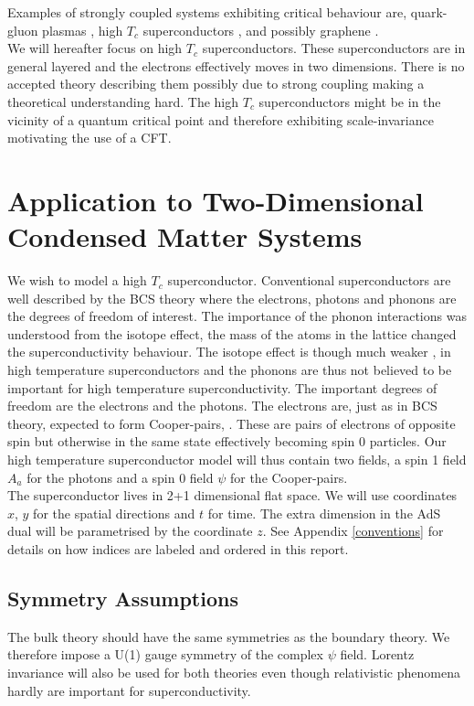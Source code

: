 \documentclass[12pt]{report}
\begin{document}
Examples of strongly coupled systems exhibiting critical behaviour are, quark-gluon plasmas \cite{PhysRevD.73.045013}, high $T_c$ superconductors \cite{hartnoll8}, and possibly graphene \cite{hartnoll8}.\\

We will hereafter focus on high $T_c$ superconductors. These superconductors are in general layered and the electrons effectively moves in two dimensions. There is no accepted theory describing them possibly due to strong coupling making a theoretical understanding hard. The high $T_c$ superconductors might be in the vicinity of a quantum critical point \cite{dome} and therefore exhibiting scale-invariance motivating the use of a CFT.

\chapter{Application to Two-Dimensional Condensed Matter Systems}
We wish to model a high $T_c$ superconductor. Conventional superconductors are well described by the BCS theory where the electrons, photons and phonons are the degrees of freedom of interest. The importance of the phonon interactions was understood from the isotope effect, the mass of the atoms in the lattice changed the superconductivity behaviour. The isotope effect is though much weaker \cite{leggett2006we}, in high temperature superconductors and the phonons are thus not believed to be important for high temperature superconductivity. The important degrees of freedom are the electrons and the photons. The electrons are, just as in BCS theory, expected to form Cooper-pairs, \cite{leggett2006we}. These are pairs of electrons of opposite spin but otherwise in the same state effectively becoming spin 0 particles. Our high temperature superconductor model will thus contain two fields, a spin 1 field $A_a$ for the photons and a spin 0 field $\psi$ for the Cooper-pairs.\\

The superconductor lives in 2+1 dimensional flat space. We will use coordinates $x$, $y$ for the spatial directions and $t$ for time. The extra dimension in the AdS dual will be parametrised by the coordinate $z$. See Appendix \ref{conventions} for details on how indices are labeled and ordered in this report. 
\section{Symmetry Assumptions}
The bulk theory should have the same symmetries as the boundary theory. We therefore impose a U(1) gauge symmetry of the complex $\psi$ field. Lorentz invariance will also be used for both theories even though relativistic phenomena hardly are important for superconductivity.
\end{document}
